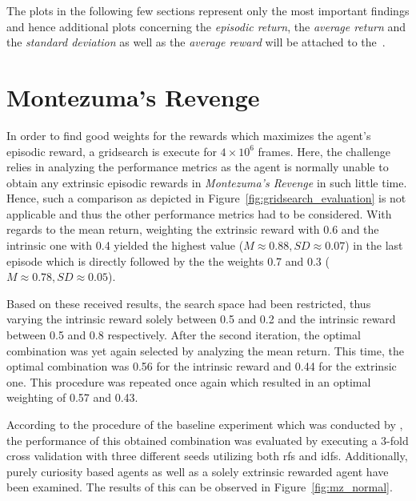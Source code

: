 \documentclass[draft,final]{vutinfth} %
\begin{document}
    The plots in the following few sections represent only the most important findings and hence additional plots concerning the \textit{episodic return}, the \textit{average return} and the \textit{standard deviation} as well as the \textit{average reward} will be attached to the~.


    \section{Montezuma's Revenge}

    In order to find good weights for the rewards which maximizes the agent's episodic reward, a gridsearch is execute for $4 \times 10^6$ frames.
    Here, the challenge relies in analyzing the performance metrics as the agent is normally unable to obtain any extrinsic episodic rewards in \textit{Montezuma's Revenge} in such little time.
    Hence, such a comparison as depicted in Figure~\ref{fig:gridsearch_evaluation} is not applicable and thus the other performance metrics had to be considered.
    With regards to the mean return, weighting the extrinsic reward with 0.6 and the intrinsic one with 0.4 yielded the highest value ($M\approx0.88,SD\approx0.07$) in the last episode which is directly followed by the the weights 0.7 and 0.3 ($M\approx0.78,SD\approx0.05$).

    Based on these received results, the search space had been restricted, thus varying the intrinsic reward solely between 0.5 and 0.2 and the intrinsic reward between 0.5 and 0.8 respectively.
    After the second iteration, the optimal combination was yet again selected by analyzing the mean return.
    This time, the optimal combination was 0.56 for the intrinsic reward and 0.44 for the extrinsic one.
    This procedure was repeated once again which resulted in an optimal weighting of 0.57 and 0.43.

    According to the procedure of the baseline experiment which was conducted by \citet{burda_large-scale_2018-1}, the performance of this obtained combination was evaluated by executing a 3-fold cross validation with three different seeds utilizing both \glspl{rf} and \glspl{idf}.
    Additionally, purely curiosity based agents as well as a solely extrinsic rewarded agent have been examined.
    The results of this can be observed in Figure~\ref{fig:mz_normal}.
\end{document}
